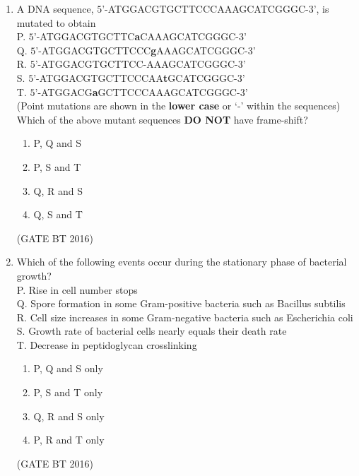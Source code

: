 \documentclass[journal,12pt,onecolumn]{IEEEtran}
\theoremstyle{remark}
\begin{document}
\begin{enumerate}
\begin{multicols}{4}
\begin{enumerate}
\item P, Q and R
\item  P, Q and T
\item  Q, R and T
\item  R, S and T
\end{enumerate}
\end{multicols} \hfill(GATE BT 2016)  

\item A DNA sequence, $5$’-ATGGACGTGCTTCCCAAAGCATCGGGC-$3’$, is mutated to obtain\\
P. $5’$-ATGGACGTGCTTC\textbf{a}CAAAGCATCGGGC-$3’$\\
Q. $5’$-ATGGACGTGCTTCCC\textbf{g}AAAGCATCGGGC-$3’$\\
R. $5’$-ATGGACGTGCTTCC-AAAGCATCGGGC-$3’$\\
S. $5’$-ATGGACGTGCTTCCCAA\textbf{t}GCATCGGGC-$3’$\\
T. $5’$-ATGGACG\textbf{a}GCTTCCCAAAGCATCGGGC-$3’$\\
(Point mutations are shown in the \textbf{lower case} or ‘-’ within the sequences)\\
Which of the above mutant sequences \textbf{DO NOT} have frame-shift?
\begin{multicols}{4}
\begin{enumerate}
\item P, Q and S
\item P, S and T
\item Q, R and S
\item  Q, S and T
\end{enumerate}
\end{multicols} \hfill(GATE BT 2016)  

\item  Which of the following events occur during the stationary phase of bacterial growth?\\
    P. Rise in cell number stops\\
    Q. Spore formation in some Gram-positive bacteria such as Bacillus subtilis\\
    R. Cell size increases in some Gram-negative bacteria such as Escherichia coli\\
    S. Growth rate of bacterial cells nearly equals their death rate\\
    T. Decrease in peptidoglycan crosslinking
\begin{multicols}{4}
\begin{enumerate}
\item P, Q and S only	
\item P, S and T only
\item Q, R and S only	
\item P, R and T only
\end{enumerate}
\end{multicols} \hfill(GATE BT 2016)  


\end{enumerate}
\end{document}
